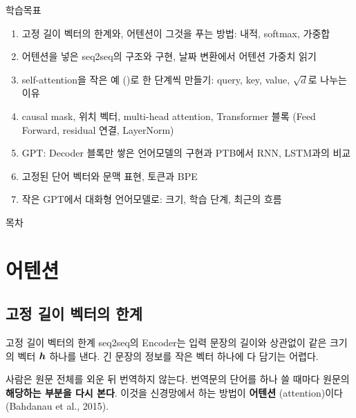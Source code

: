 \documentclass[aspectratio=169,11pt]{beamer}
\begin{document}
\begin{frame}{학습목표}
\begin{enumerate}
\item 고정 길이 벡터의 한계와, 어텐션이 그것을 푸는 방법: 내적, softmax, 가중합
\item 어텐션을 넣은 seq2seq의 구조와 구현, 날짜 변환에서 어텐션 가중치 읽기
\item self-attention을 작은 예 ()로 한 단계씩 만들기:
  query, key, value, $\sqrt d$로 나누는 이유
\item causal mask, 위치 벡터, multi-head attention,
  Transformer 블록 (Feed Forward, residual 연결, LayerNorm)
\item GPT: Decoder 블록만 쌓은 언어모델의 구현과 PTB에서 RNN, LSTM과의 비교
\item 고정된 단어 벡터와 문맥 표현, 토큰과 BPE
\item 작은 GPT에서 대화형 언어모델로: 크기, 학습 단계, 최근의 흐름
\end{enumerate}
\end{frame}

\begin{frame}{목차}
\tableofcontents[firstsection=-7,hideallsubsections]
\end{frame}

\setcounter{section}{8}

\section{어텐션}

\subsection{고정 길이 벡터의 한계}

\begin{frame}{고정 길이 벡터의 한계}
seq2seq의 Encoder는 입력 문장의 길이와 상관없이 같은 크기의 벡터 $\bm{h}$ 하나를 낸다.
\vskip2mm
긴 문장의 정보를 작은 벡터 하나에 다 담기는 어렵다.
\vskip1mm
\begin{keybox}
사람은 원문 전체를 외운 뒤 번역하지 않는다.
번역문의 단어를 하나 쓸 때마다 원문의 \textbf{해당하는 부분을 다시 본다}.
이것을 신경망에서 하는 방법이 \textbf{어텐션} (attention)이다 (Bahdanau et al., 2015).
\end{keybox}
\end{frame}
\end{document}
